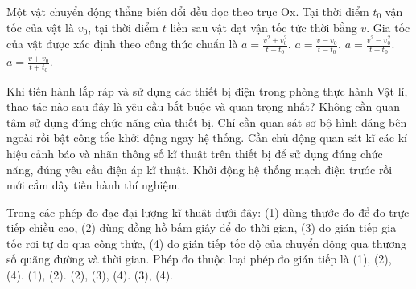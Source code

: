 \begin{ex}%
	Một vật chuyển động thẳng biến đổi đều dọc theo trục Ox. Tại thời điểm $t_0$ vận tốc của vật là $v_0$, tại thời điểm $t$ liền sau vật đạt vận tốc tức thời bằng $v$. Gia tốc của vật được xác định theo công thức chuẩn là
	\choice
	{$a=\frac{v^2+v_0^2}{t-t_0}$.}
	{\True $a=\frac{v-v_0}{t-t_0}$.}
	{$a=\frac{v^2-v_0^2}{t-t_0}$.}
	{$a=\frac{v+v_0}{t+t_0}$.}
\end{ex}

\begin{ex}%
	Khi tiến hành lắp ráp và sử dụng các thiết bị điện trong phòng thực hành Vật lí, thao tác nào sau đây là yêu cầu bắt buộc và quan trọng nhất?
	\choice
	{Không cần quan tâm sử dụng đúng chức năng của thiết bị.}
	{Chỉ cần quan sát sơ bộ hình dáng bên ngoài rồi bật công tắc khởi động ngay hệ thống.}
	{\True Cần chủ động quan sát kĩ các kí hiệu cảnh báo và nhãn thông số kĩ thuật trên thiết bị để sử dụng đúng chức năng, đúng yêu cầu điện áp kĩ thuật.}
	{Khởi động hệ thống mạch điện trước rồi mới cắm dây tiến hành thí nghiệm.}
\end{ex}

\begin{ex}%
	Trong các phép đo đạc đại lượng kĩ thuật dưới đây: (1) dùng thước đo để đo trực tiếp chiều cao, (2) dùng đồng hồ bấm giây để đo thời gian, (3) đo gián tiếp gia tốc rơi tự do qua công thức, (4) đo gián tiếp tốc độ của chuyển động qua thương số quãng đường và thời gian. Phép đo thuộc loại phép đo gián tiếp là
	\choice
	{(1), (2), (4).}
	{(1), (2).}
	{(2), (3), (4).}
	{\True (3), (4).}
\end{ex}

